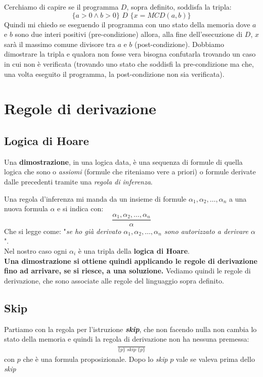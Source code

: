 Cerchiamo di capire se il programma $D$, sopra definito, soddisfa la tripla:
\[\{a>0\land b>0\}\,\, D\,\, \{x=MCD(a, b)\}\]
Quindi mi chiedo se eseguendo il programma con uno stato della memoria dove $a$
e $b$ sono due interi positivi (pre-condizione) allora, alla fine dell'esecuzione
di $D$, $x$ sarà il massimo comune divisore tra $a$ e $b$
(post-condizione). Dobbiamo dimostrare la tripla e qualora non fosse vera bisogna
confutarla trovando un caso in cui non è verificata (trovando uno stato che
soddisfi la pre-condizione ma che, una volta eseguito il programma, la post-condizione non 
sia verificata).
\section{Regole di derivazione}
\subsection{Logica di Hoare}
\begin{definizione}
	Una \textbf{dimostrazione}, in una logica data, è una sequenza di formule di
	quella logica che sono o \textit{assiomi} (formule che riteniamo vere a
	priori) o formule derivate dalle precedenti tramite una \textit{regola di
	inferenza}. 
\end{definizione}
Una regola d'inferenza mi manda da un insieme di formule
$\alpha_1,\alpha_2,\ldots,\alpha_n$ a una nuova formula $\alpha$ e si indica
con: 
\[\frac{\alpha_1,\alpha_2,\ldots,\alpha_n}{\alpha}\]
Che si legge come: "\textit{se ho già derivato $\alpha_1, \alpha_2,
	\ldots,\alpha_n$ sono autorizzato a derivare $\alpha$}".\\ 
Nel nostro caso ogni $\alpha_i$ è una tripla della \textbf{logica di Hoare}.\\
\textbf{Una dimostrazione si ottiene quindi applicando le regole di derivazione fino
ad arrivare, se si riesce, a una soluzione.}
Vediamo quindi le regole di derivazione, che sono associate alle regole del
linguaggio sopra definito.
\subsection{Skip}
\begin{definizione}
	Partiamo con la regola per l'istruzione \textbf{\textit{skip}}, che non
	facendo nulla 
	non cambia lo stato della memoria e quindi la regola di derivazione non ha
	nessuna premessa:
	\begin{align}\label{SkipRule}
		\frac{}{\{p\}\,\, skip\,\,\{p\}} 
	\end{align}
	con $p$ che è una formula proposizionale. Dopo lo \textit{skip} $p$ vale se
	valeva prima dello \textit{skip}
\end{definizione}
